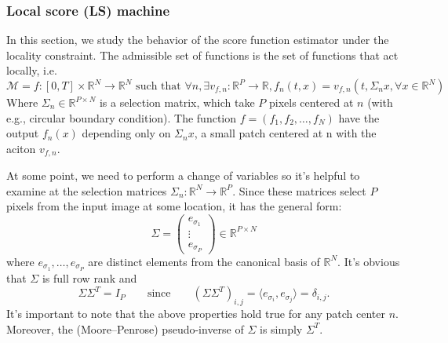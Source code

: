 \documentclass[a4paper,10pt]{article}
\theoremstyle{definition} %
\theoremstyle{definition} %
\theoremstyle{definition} %
\theoremstyle{definition} %
\newcommand{\R}{\mathbb{R}}
\newcommand{\0}{\boldsymbol{0}}
\begin{document}
\subsubsection{Local score (LS) machine}
In this section, we study the behavior of the score function estimator under the locality constraint.
The admissible set of functions is the set of functions that act locally, i.e. 
\begin{equation*}
    \mathcal{M} = {f:[0,T]\times\R^N \rightarrow \R^N \text{ such that } \forall n, \exists v_{f,n} : \R^P \rightarrow \R, f_n(t,x)=v_{f,n}(t,\Sigma_n x, \forall x\in \R^N)}
\end{equation*}
Where $\Sigma_n \in \R^{P\times N}$ is a selection matrix, which take $P$ pixels centered at $n$ (with e.g., circular boundary condition). The function $f = (f_1,f_2,\dots,f_N)$ have the output $f_n(x)$ depending only on $\Sigma_n x$, a small patch centered at n with the aciton $v_{f,n}$.

At some point, we need to perform a change of variables so it's helpful to examine at the selection matrices 
$\Sigma_n : \mathbb{R}^N \rightarrow \mathbb{R}^P$. 
Since these matrices select $P$ pixels from the input image at some location, it has the general form:
\[
\Sigma = 
\begin{pmatrix}
e_{\sigma_1} \\
\vdots \\
e_{\sigma_P}
\end{pmatrix}
\in \mathbb{R}^{P \times N}
\]
where $e_{\sigma_1}, \ldots, e_{\sigma_P}$ are distinct elements from the canonical basis of $\mathbb{R}^N$. 
It's obvious that $\Sigma$ is full row rank and
\[
\Sigma \Sigma^T = I_P \qquad \text{since} \qquad (\Sigma \Sigma^T)_{i,j} = \langle e_{\sigma_i}, e_{\sigma_j} \rangle = \delta_{i,j}.
\]
It's important to note that the above properties hold true for any patch center $n$. 
Moreover, the (Moore–Penrose) pseudo-inverse of $\Sigma$ is simply $\Sigma^T$.
\end{document}
